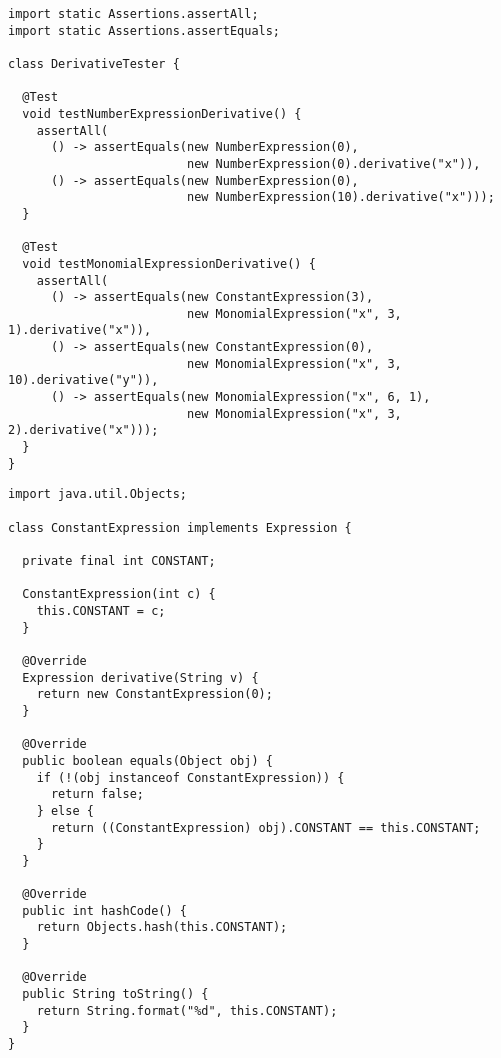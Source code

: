 \begin{lstlisting}[language=MyJava]
import static Assertions.assertAll;
import static Assertions.assertEquals;

class DerivativeTester {

  @Test
  void testNumberExpressionDerivative() {
    assertAll(
      () -> assertEquals(new NumberExpression(0),
                         new NumberExpression(0).derivative("x")),
      () -> assertEquals(new NumberExpression(0),
                         new NumberExpression(10).derivative("x")));
  }

  @Test
  void testMonomialExpressionDerivative() {
    assertAll(
      () -> assertEquals(new ConstantExpression(3),
                         new MonomialExpression("x", 3, 1).derivative("x")),
      () -> assertEquals(new ConstantExpression(0),
                         new MonomialExpression("x", 3, 10).derivative("y")),
      () -> assertEquals(new MonomialExpression("x", 6, 1),
                         new MonomialExpression("x", 3, 2).derivative("x")));
  }
}
\end{lstlisting}

\begin{lstlisting}[language=MyJava]
import java.util.Objects;

class ConstantExpression implements Expression {

  private final int CONSTANT;

  ConstantExpression(int c) { 
    this.CONSTANT = c; 
  }

  @Override
  Expression derivative(String v) { 
    return new ConstantExpression(0); 
  }

  @Override
  public boolean equals(Object obj) {
    if (!(obj instanceof ConstantExpression)) { 
      return false; 
    } else { 
      return ((ConstantExpression) obj).CONSTANT == this.CONSTANT; 
    }
  }

  @Override
  public int hashCode() { 
    return Objects.hash(this.CONSTANT); 
  }

  @Override
  public String toString() { 
    return String.format("%d", this.CONSTANT); 
  }
}
\end{lstlisting}


